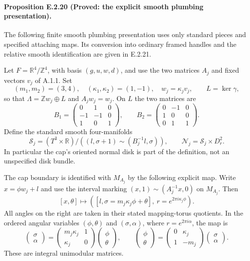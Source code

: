 \paragraph{Proposition E.2.20 (Proved: the explicit smooth plumbing presentation).}
The following finite smooth plumbing presentation uses only standard
pieces and specified attaching maps. Its conversion into ordinary
framed handles and the relative smooth identification are given in E.2.21.

Let $F=\mathbb R^4/\mathbb Z^4$, with basis $(g,u,w,d)$, and use the
two matrices $A_j$ and fixed vectors $v_j$ of A.1.1.  Set
\[
 (m_1,m_2)=(3,4),\quad(\kappa_1,\kappa_2)=(1,-1),\quad
 w_j=\kappa_jv_j,\qquad L=\ker\gamma,
\]
so that $\Lambda=\mathbb Zw_j\oplus L$ and $A_jw_j=w_j$.
On $L$ the two matrices are
\[
 B_1=\begin{pmatrix}0&1&0\\-1&-1&0\\1&0&1\end{pmatrix},
 \qquad
 B_2=\begin{pmatrix}0&-1&0\\1&0&0\\0&1&1\end{pmatrix}.
 \tag{E.U1}
\]
Define the standard smooth four-manifolds
\[
 \mathcal S_j=(T^3\times\mathbb R)/
       ((l,\sigma+1)\sim(B_j^{-1}l,\sigma)),
 \qquad \mathcal N_j=\mathcal S_j\times D^2_r.
 \tag{E.U2}
\]
In particular the cap's oriented normal disk is part of the
definition, not an unspecified disk bundle.

The cap boundary is identified with $M_{A_j}$ by the following
explicit map.  Write $x=\phi w_j+l$ and use the interval marking
$(x,1)\sim(A_j^{-1}x,0)$ on $M_{A_j}$.  Then
\[
 [x,\theta]\longmapsto
 \left([l,\sigma=m_j\kappa_j\phi+\theta],
                         \ r=e^{2\pi i\kappa_j\phi}\right).
 \tag{E.U3}
\]
All angles on the right are taken in their stated mapping-torus
quotients.  In the ordered angular variables $(\phi,\theta)$
and $(\sigma,\alpha)$, where $r=e^{2\pi i\alpha}$, the map is
\[
 \begin{pmatrix}\sigma\\\alpha\end{pmatrix}
 =
 \begin{pmatrix}m_j\kappa_j&1\\\kappa_j&0\end{pmatrix}
 \begin{pmatrix}\phi\\\theta\end{pmatrix},
 \qquad
 \begin{pmatrix}\phi\\\theta\end{pmatrix}
 =
 \begin{pmatrix}0&\kappa_j\\1&-m_j\end{pmatrix}
 \begin{pmatrix}\sigma\\\alpha\end{pmatrix}.
 \tag{E.U4}
\]
These are integral unimodular matrices.

